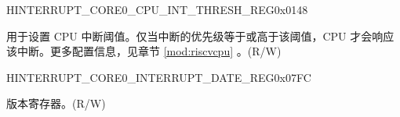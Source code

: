\begin{register}{H}{INTERRUPT\_CORE0\_CPU\_INT\_THRESH\_REG}{0x0148}\label{regdesc:INTERRUPTCORE0CPUINTTHRESHREG}
%
%
\regnewline%
\begin{regdesc}\begin{reglist}
\label{fielddesc:INTERRUPTCORE0CPUINTTHRESH}\item [INTERRUPT\_CORE0\_CPU\_INT\_THRESH] 用于设置 CPU 中断阈值。仅当中断的优先级等于或高于该阈值，CPU 才会响应该中断。更多配置信息，见章节 \ref{mod:riscvcpu} \textit{}。(R/W)

\end{reglist}\end{regdesc}
\end{register}


\begin{register}{H}{INTERRUPT\_CORE0\_INTERRUPT\_DATE\_REG}{0x07FC}\label{regdesc:INTERRUPTCORE0INTERRUPTDATEREG}
%
%
\regnewline%
\begin{regdesc}\begin{reglist}
\label{fielddesc:INTERRUPTCORE0INTERRUPTDATE}\item [INTERRUPT\_CORE0\_INTERRUPT\_DATE] 版本寄存器。(R/W)

\end{reglist}\end{regdesc}
\end{register}

